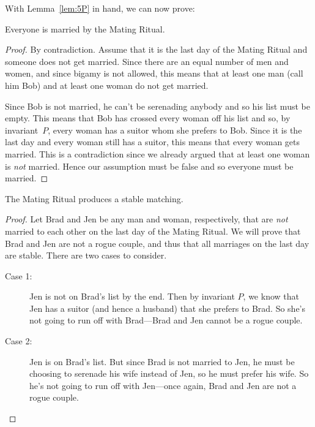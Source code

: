 With Lemma~\ref{lem:5P} in hand, we can now prove:

\begin{theorem}
Everyone is married by the Mating Ritual.
\end{theorem}

\begin{proof}
By contradiction. Assume that it is the last day of the Mating Ritual
and someone does not get married.  Since there are an equal number of
men and women, and since bigamy is not allowed, this means that at
least one man (call him Bob) and at least one woman do not get
married.

Since Bob is not married, he can't be serenading anybody and so his
list must be empty.  This means that Bob has crossed every woman off
his list and so, by invariant~$P$, every woman has a suitor whom she
prefers to Bob.  Since it is the last day and every woman still has a
suitor, this means that every woman gets married.  This is a
contradiction since we already argued that at least one woman is
\emph{not} married.  Hence our assumption must be false and so
everyone must be married.
\end{proof}

\begin{theorem}
The Mating Ritual produces a stable matching.
\end{theorem}

\begin{proof}
Let Brad and Jen be any man and woman, respectively, that are
\emph{not} married to each other on the last day of the Mating Ritual.
We will prove that Brad and Jen are not a rogue couple, and thus that
all marriages on the last day are stable.  There are two cases to consider.
\begin{description}

\item[Case 1:] Jen is not on Brad's list by the end.  Then by invariant
  $P$, we know that Jen has a suitor (and hence a husband) that she
  prefers to Brad.  So she's not going to run off with Brad---Brad and
  Jen cannot be a rogue couple.

\item[Case 2:] Jen is on Brad's list.  But since Brad is not married to
  Jen, he must be choosing to serenade his wife instead of Jen, so he
  must prefer his wife.  So he's not going to run off with Jen---once
  again, Brad and Jen are not a rogue couple.
 \qedhere

\end{description}

\end{proof}


